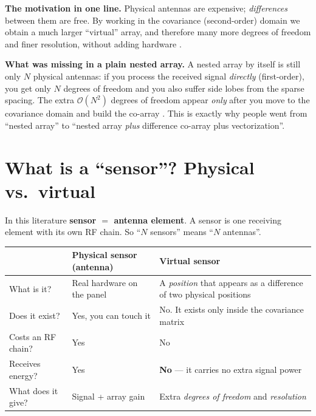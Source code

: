 \documentclass[11pt]{article}
\begin{document}
\begin{keybox}
\textbf{The motivation in one line.} Physical antennas are expensive; \emph{differences} between them
are free. By working in the covariance (second-order) domain we obtain a much larger ``virtual''
array, and therefore many more degrees of freedom and finer resolution, without adding hardware
\cite{pal2010nested,vaidyanathan2011coprime}.
\end{keybox}

\textbf{What was missing in a plain nested array.} A nested array by itself is still only $N$
physical antennas: if you process the received signal \emph{directly} (first-order), you get only
$N$ degrees of freedom and you also suffer side lobes from the sparse spacing. The extra
$\mathcal{O}(N^{2})$ degrees of freedom appear \emph{only} after you move to the covariance domain
and build the co-array \cite{pal2010nested}. This is exactly why people went from ``nested array''
to ``nested array \emph{plus} difference co-array plus vectorization''.

\section{What is a ``sensor''? Physical vs.\ virtual}

In this literature \textbf{sensor $=$ antenna element}. A sensor is one receiving element with its
own RF chain. So ``$N$ sensors'' means ``$N$ antennas''.

\begin{center}
\renewcommand{\arraystretch}{1.25}
\begin{tabular}{@{}p{3.3cm}p{5.6cm}p{5.6cm}@{}}
\toprule
 & \textbf{Physical sensor (antenna)} & \textbf{Virtual sensor}\\
\midrule
What is it? & Real hardware on the panel & A \emph{position} that appears as a difference of two
 physical positions\\
Does it exist? & Yes, you can touch it & No. It exists only inside the covariance matrix\\
Costs an RF chain? & Yes & No\\
Receives energy? & Yes & \textbf{No} --- it carries no extra signal power\\
What does it give? & Signal + array gain & Extra \emph{degrees of freedom} and \emph{resolution}\\
\bottomrule
\end{tabular}
\end{center}
\end{document}
